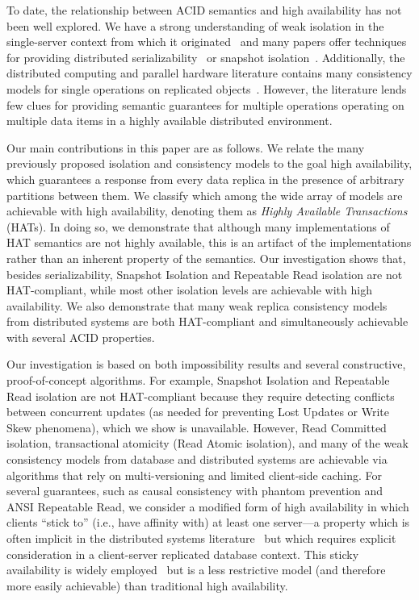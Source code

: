 To date, the relationship between ACID semantics and high
availability has not been well explored. We have a strong
understanding of weak isolation in the single-server context from
which it originated~\cite{adya, ansicritique, gray-isolation} and many
papers offer techniques for providing distributed
serializability~\cite{bernstein-book, spanner, daudjee-session,
  hstore, calvin} or snapshot
isolation~\cite{daudjee-snapshot, walter}. Additionally, the distributed computing and parallel
hardware literature contains many consistency models for single
operations on replicated objects~\cite{pnuts, herlihy-art, eiger, cac,
  sessionguarantees}. However, the literature lends few clues for
providing semantic guarantees for multiple operations operating on
multiple data items in a highly available distributed environment.

Our main contributions in this paper are as follows. We relate the
many previously proposed isolation and consistency models to the goal
high availability, which guarantees a response from every data replica
in the presence of arbitrary partitions between them.  We classify
which among the wide array of models are achievable with high
availability, denoting them as {\em Highly Available Transactions}
(HATs). In doing so, we demonstrate that although many implementations
of HAT semantics are not highly available, this is an artifact of the
implementations rather than an inherent property of the semantics. Our
investigation shows that, besides serializability, Snapshot Isolation
and Repeatable Read isolation are not HAT-compliant, while most other
isolation levels are achievable with high availability. We also
demonstrate that many weak replica consistency models from distributed
systems are both HAT-compliant and simultaneously achievable with
several ACID properties.

Our investigation is based on both impossibility results and several
constructive, proof-of-concept algorithms. For example, Snapshot
Isolation and Repeatable Read isolation are not HAT-compliant because
they require detecting conflicts between concurrent updates (as needed
for preventing Lost Updates or Write Skew phenomena), which we show is
unavailable. However, Read Committed isolation, transactional
atomicity (Read Atomic isolation), and many of the weak consistency
models from database and distributed systems are achievable via
algorithms that rely on multi-versioning and limited client-side
caching. For several guarantees, such as causal consistency with
phantom prevention and ANSI Repeatable Read, we consider a modified
form of high availability in which clients ``stick to'' (i.e., have
affinity with) at least one server---a property which is often
implicit in the distributed systems literature~\cite{herlihy-art,
  eiger, cac} but which requires explicit consideration in a
client-server replicated database context. This sticky availability is
widely employed~\cite{eiger, vogels-defs} but is a less restrictive
model (and therefore more easily achievable) than traditional high
availability.

